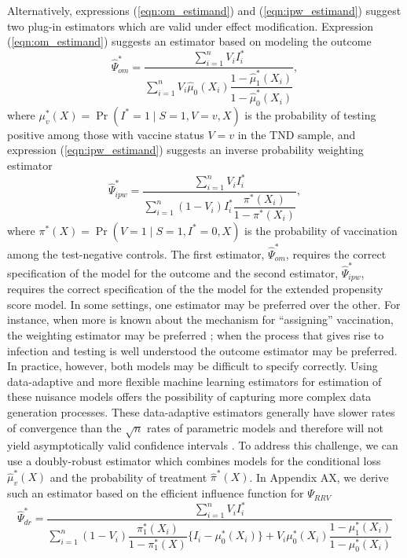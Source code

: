 \documentclass[11pt]{article}
\begin{document}
Alternatively, expressions (\ref{eqn:om_estimand}) and (\ref{eqn:ipw_estimand}) suggest two plug-in estimators which are valid under effect modification. Expression (\ref{eqn:om_estimand}) suggests an estimator based on modeling the outcome
\begin{equation}\label{eqn:om_estimator}
    \widehat{\Psi}_{om}^* = \dfrac{\sum_{i=1}^n V_i I^*_i}{\sum_{i=1}^n V_i \widehat{\mu}_0(X_i)\dfrac{1 - \widehat{\mu}^*_1(X_i)}{1 - \widehat{\mu}^*_0(X_i)}},
\end{equation}
where $\mu^*_v(X) = \Pr(I^*=1\mid S=1, V=v, X)$ is the probability of testing positive among those with vaccine status $V =v$ in the TND sample, and expression (\ref{eqn:ipw_estimand}) suggests an inverse probability weighting estimator
\begin{equation}\label{eqn:ipw_estimator}
    \widehat{\Psi}_{ipw}^* = \dfrac{\sum_{i=1}^n V_i I^*_i}{\sum_{i=1}^n (1 - V_i) I^*_i \dfrac{\pi^*(X_i)}{1 - \pi^*(X_i)}},
\end{equation}
where $\pi^*(X) = \Pr(V=1\mid S=1, I^*=0, X)$ is the probability of vaccination among the test-negative controls. The first estimator, $\widehat{\Psi}_{om}^*$, requires the correct specification of the model for the outcome and the second estimator, $\widehat{\Psi}_{ipw}^*$,  requires the correct specification of the the model for the extended propensity score model. In some settings, one estimator may be preferred over the other. For instance, when more is known about the mechanism for ``assigning'' vaccination, the weighting estimator may be preferred \cite{robins_estimating_1992,braitman_rare_2002}; when the process that gives rise to infection and testing is well understood the outcome estimator may be preferred. In practice, however, both models may be difficult to specify correctly. Using data-adaptive and more flexible machine learning estimators for estimation of these nuisance models offers the possibility of capturing more complex data generation processes. These data-adaptive estimators generally have slower rates of convergence than the $\sqrt{n}$ rates of parametric models and therefore will not yield asymptotically valid confidence intervals \cite{chernozhukov_doubledebiased_2018}. To address this challenge, we can use a doubly-robust estimator which combines models for the conditional loss $\widehat{\mu}^*_v(X)$ and the probability of treatment $\widehat{\pi}^*(X)$. In Appendix AX, we derive such an estimator based on the efficient influence function for $\Psi_{RRV}$
\begin{equation}\label{eqn:dr_estimator}
    \widehat{\Psi}_{dr}^* = \dfrac{\sum_{i=1}^n V_i I^*_i}{\sum_{i=1}^n (1 - V_i)\dfrac{\pi^*_1(X_i)}{1 - \pi^*_1(X)} \{I_i - \mu^*_0(X_i) \} + V_i \mu^*_0(X_i)\dfrac{1 - \mu^*_1(X_i)}{1 - \mu^*_0(X_i)}}
\end{equation}
\end{document}
